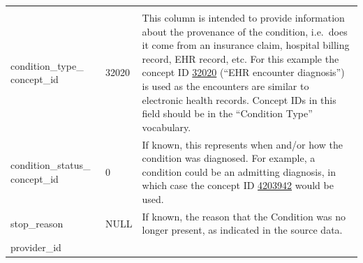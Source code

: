 \documentclass[11pt]{book}
\theoremstyle{definition}
\theoremstyle{definition}
\theoremstyle{definition}
\theoremstyle{remark}
\begin{document}
\begin{longtable}[]{@{}lll@{}}
\begin{minipage}[t]{0.49\columnwidth}
\end{minipage}\tabularnewline
\begin{minipage}[t]{0.28\columnwidth}\raggedright
condition\_type\_ concept\_id\strut
\end{minipage} & \begin{minipage}[t]{0.15\columnwidth}\raggedright
32020\strut
\end{minipage} & \begin{minipage}[t]{0.49\columnwidth}\raggedright
This column is intended to provide information about the provenance of the condition, i.e.~does it come from an insurance claim, hospital billing record, EHR record, etc. For this example the concept ID \href{http://athena.ohdsi.org/search-terms/terms/32020}{32020} (``EHR encounter diagnosis'') is used as the encounters are similar to electronic health records. Concept IDs in this field should be in the ``Condition Type'' vocabulary.\strut
\end{minipage}\tabularnewline
\begin{minipage}[t]{0.28\columnwidth}\raggedright
condition\_status\_ concept\_id\strut
\end{minipage} & \begin{minipage}[t]{0.15\columnwidth}\raggedright
0\strut
\end{minipage} & \begin{minipage}[t]{0.49\columnwidth}\raggedright
If known, this represents when and/or how the condition was diagnosed. For example, a condition could be an admitting diagnosis, in which case the concept ID \href{http://athena.ohdsi.org/search-terms/terms/4203942}{4203942} would be used.\strut
\end{minipage}\tabularnewline
\begin{minipage}[t]{0.28\columnwidth}\raggedright
stop\_reason\strut
\end{minipage} & \begin{minipage}[t]{0.15\columnwidth}\raggedright
NULL\strut
\end{minipage} & \begin{minipage}[t]{0.49\columnwidth}\raggedright
If known, the reason that the Condition was no longer present, as indicated in the source data.\strut
\end{minipage}\tabularnewline
\begin{minipage}[t]{0.28\columnwidth}\raggedright
provider\_id\strut
\end{minipage} & \begin{minipage}[t]{0.15\columnwidth}\raggedright

\end{minipage}
\end{longtable}
\end{document}

